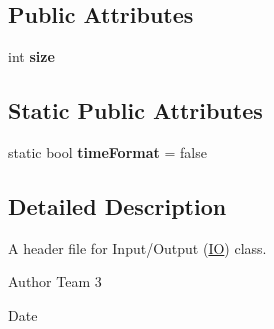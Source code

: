 \subsection*{Public Attributes}
\begin{DoxyCompactItemize}
\item 
\hypertarget{classIO_a4e344c74454e6609b817e3fdb3fcddf3}{int {\bfseries size}}\label{classIO_a4e344c74454e6609b817e3fdb3fcddf3}

\end{DoxyCompactItemize}
\subsection*{Static Public Attributes}
\begin{DoxyCompactItemize}
\item 
\hypertarget{classIO_a04cf024687a6a86007db5ecfcab69e5c}{static bool {\bfseries time\-Format} = false}\label{classIO_a04cf024687a6a86007db5ecfcab69e5c}

\end{DoxyCompactItemize}


\subsection{Detailed Description}
A header file for Input/\-Output (\hyperlink{classIO}{I\-O}) class. 

\begin{DoxyAuthor}{Author}
Team 3 
\end{DoxyAuthor}
\begin{DoxyDate}{Date}

\end{DoxyDate}


